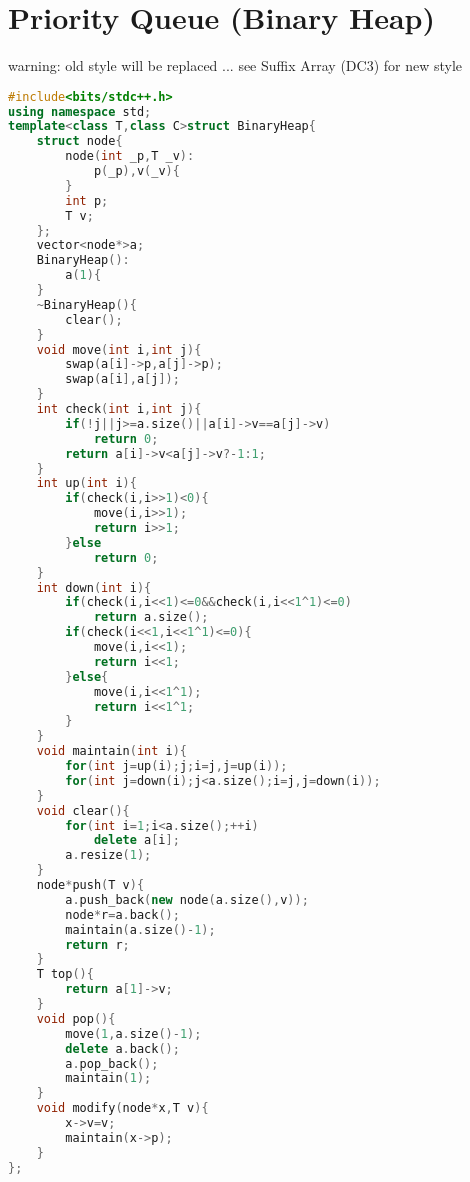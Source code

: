 \documentclass{book}
\begin{document}
\section{Priority Queue (Binary Heap)}
warning: old style will be replaced ... see Suffix Array (DC3) for new style\begin{lstlisting}[language=C++,title={Priority Queue (Binary Heap).hpp (1629 bytes, 73 lines)}]
#include<bits/stdc++.h>
using namespace std;
template<class T,class C>struct BinaryHeap{
    struct node{
        node(int _p,T _v):
            p(_p),v(_v){
        }
        int p;
        T v;
    };
    vector<node*>a;
    BinaryHeap():
        a(1){
    }
    ~BinaryHeap(){
        clear();
    }
    void move(int i,int j){
        swap(a[i]->p,a[j]->p);
        swap(a[i],a[j]);
    }
    int check(int i,int j){
        if(!j||j>=a.size()||a[i]->v==a[j]->v)
            return 0;
        return a[i]->v<a[j]->v?-1:1;
    }
    int up(int i){
        if(check(i,i>>1)<0){
            move(i,i>>1);
            return i>>1;
        }else
            return 0;
    }
    int down(int i){
        if(check(i,i<<1)<=0&&check(i,i<<1^1)<=0)
            return a.size();
        if(check(i<<1,i<<1^1)<=0){
            move(i,i<<1);
            return i<<1;
        }else{
            move(i,i<<1^1);
            return i<<1^1;
        }
    }
    void maintain(int i){
        for(int j=up(i);j;i=j,j=up(i));
        for(int j=down(i);j<a.size();i=j,j=down(i));
    }
    void clear(){
        for(int i=1;i<a.size();++i)
            delete a[i];
        a.resize(1);
    }
    node*push(T v){
        a.push_back(new node(a.size(),v));
        node*r=a.back();
        maintain(a.size()-1);
        return r;
    }
    T top(){
        return a[1]->v;
    }
    void pop(){
        move(1,a.size()-1);
        delete a.back();
        a.pop_back();
        maintain(1);
    }
    void modify(node*x,T v){
        x->v=v;
        maintain(x->p);
    }
};
\end{lstlisting}
\end{document}
